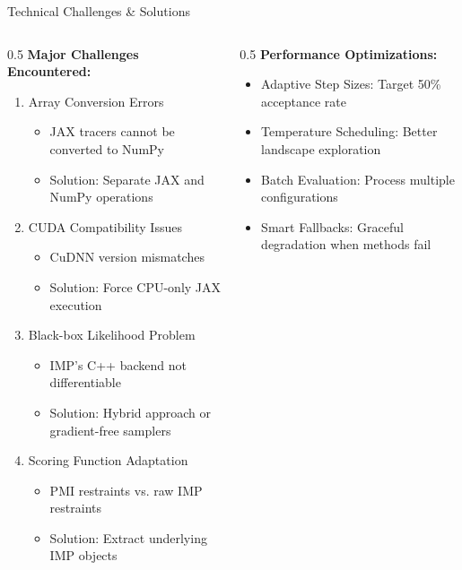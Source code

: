 \documentclass[aspectratio=169]{beamer}
\begin{document}
\begin{frame}{Technical Challenges \& Solutions}
\begin{columns}[T]
\begin{column}{0.5\textwidth}
\textbf{Major Challenges Encountered:}

\begin{enumerate}
    \item \alert{Array Conversion Errors}
    \begin{itemize}
        \item JAX tracers cannot be converted to NumPy
        \item Solution: Separate JAX and NumPy operations
    \end{itemize}
    
    \vspace{0.3cm}
    \item \alert{CUDA Compatibility Issues}
    \begin{itemize}
        \item CuDNN version mismatches
        \item Solution: Force CPU-only JAX execution
    \end{itemize}
    
    \vspace{0.3cm}
    \item \alert{Black-box Likelihood Problem}
    \begin{itemize}
        \item IMP's C++ backend not differentiable
        \item Solution: Hybrid approach or gradient-free samplers
    \end{itemize}
    
    \vspace{0.3cm}
    \item \alert{Scoring Function Adaptation}
    \begin{itemize}
        \item PMI restraints vs. raw IMP restraints
        \item Solution: Extract underlying IMP objects
    \end{itemize}
\end{enumerate}
\end{column}

\begin{column}{0.5\textwidth}
\textbf{Performance Optimizations:}

\begin{itemize}
    \item \alert{Adaptive Step Sizes}: Target 50\% acceptance rate
    \item \alert{Temperature Scheduling}: Better landscape exploration
    \item \alert{Batch Evaluation}: Process multiple configurations
    \item \alert{Smart Fallbacks}: Graceful degradation when methods fail
\end{itemize}


\end{column}
\end{columns}
\end{frame}
\end{document}
